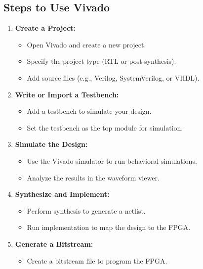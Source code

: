\subsection{Steps to Use Vivado}
\begin{enumerate}
    \item \textbf{Create a Project:}
    \begin{itemize}
        \item Open Vivado and create a new project.
        \item Specify the project type (RTL or post-synthesis).
        \item Add source files (e.g., Verilog, SystemVerilog, or VHDL).
    \end{itemize}

    \item \textbf{Write or Import a Testbench:}
    \begin{itemize}
        \item Add a testbench to simulate your design.
        \item Set the testbench as the top module for simulation.
    \end{itemize}

    \item \textbf{Simulate the Design:}
    \begin{itemize}
        \item Use the Vivado simulator to run behavioral simulations.
        \item Analyze the results in the waveform viewer.
    \end{itemize}

    \item \textbf{Synthesize and Implement:}
    \begin{itemize}
        \item Perform synthesis to generate a netlist.
        \item Run implementation to map the design to the FPGA.
    \end{itemize}

    \item \textbf{Generate a Bitstream:}
    \begin{itemize}
        \item Create a bitstream file to program the FPGA.
    \end{itemize}
\end{enumerate}

